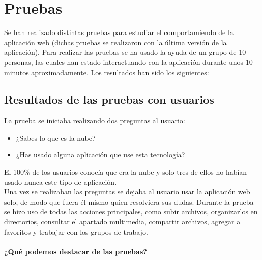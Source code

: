 \chapter{Pruebas}

Se han realizado distintas pruebas para estudiar el comportamiendo de la aplicación web (dichas pruebas se realizaron con la última versión de la aplicación). Para realizar las pruebas se ha usado la ayuda de un grupo de 10 personas, las cuales han estado interactuando con la aplicación durante unos 10 minutos aproximadamente. Los resultados han sido los siguientes:

\section{Resultados de las pruebas con usuarios}
La prueba se iniciaba realizando dos preguntas al usuario:

\begin{itemize}
	\item ¿Sabes lo que es la nube?
	\item ¿Has usado alguna aplicación que use esta tecnología?
\end{itemize}

El 100\% de los usuarios conocía que era la nube y solo tres de ellos no habían usado nunca este tipo de aplicación. \\


Una vez se realizaban las preguntas se dejaba al usuario usar la aplicación web solo, de modo que fuera él mismo quien resolviera sus dudas. Durante la prueba se hizo uso de todas las acciones principales, como subir archivos, organizarlos en directorios, consultar el apartado multimedia, compartir archivos, agregar a favoritos y trabajar con los grupos de trabajo. \\

\subsubsection{¿Qué podemos destacar de las pruebas?}

